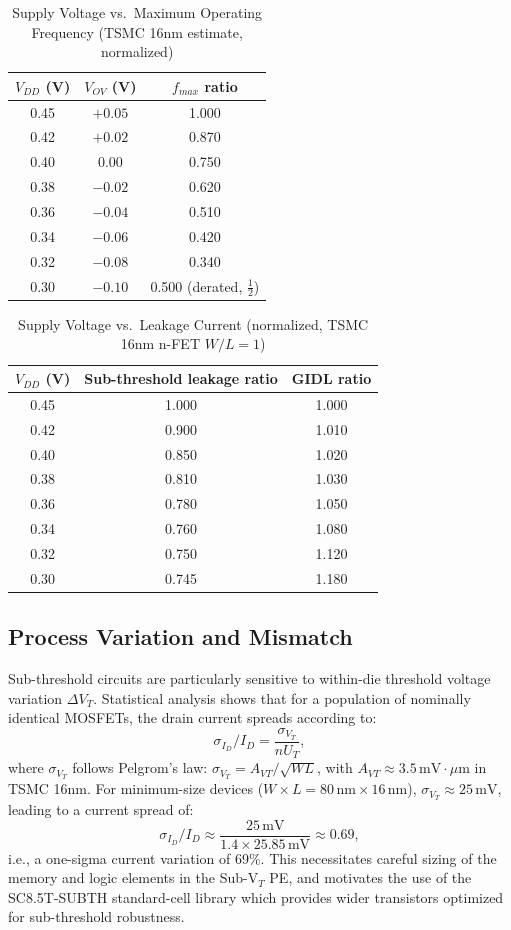 \begin{table}[htbp]
\centering
\caption{Supply Voltage vs.\ Maximum Operating Frequency (TSMC 16nm estimate, normalized)}
\label{tab:v_fmax}
\begin{tabular}{ccc}
\hline
$V_{DD}$ (V) & $V_{OV}$ (V) & $f_{max}$ ratio \\
\hline
0.45 & $+0.05$ & 1.000 \\
0.42 & $+0.02$ & 0.870 \\
0.40 &  $0.00$ & 0.750 \\
0.38 & $-0.02$ & 0.620 \\
0.36 & $-0.04$ & 0.510 \\
0.34 & $-0.06$ & 0.420 \\
0.32 & $-0.08$ & 0.340 \\
0.30 & $-0.10$ & 0.500 (derated, $\frac{1}{2}$) \\
\hline
\end{tabular}
\end{table}

\begin{table}[htbp]
\centering
\caption{Supply Voltage vs.\ Leakage Current (normalized, TSMC 16nm n-FET $W/L=1$)}
\label{tab:v_leakage}
\begin{tabular}{ccc}
\hline
$V_{DD}$ (V) & Sub-threshold leakage ratio & GIDL ratio \\
\hline
0.45 & 1.000 & 1.000 \\
0.42 & 0.900 & 1.010 \\
0.40 & 0.850 & 1.020 \\
0.38 & 0.810 & 1.030 \\
0.36 & 0.780 & 1.050 \\
0.34 & 0.760 & 1.080 \\
0.32 & 0.750 & 1.120 \\
0.30 & 0.745 & 1.180 \\
\hline
\end{tabular}
\end{table}

\subsection{Process Variation and Mismatch}

Sub-threshold circuits are particularly sensitive to within-die threshold voltage variation
$\Delta V_T$.  Statistical analysis shows that for a population of nominally identical
MOSFETs, the drain current spreads according to:
\[
  \sigma_{I_D} / I_D = \frac{\sigma_{V_T}}{n U_T},
\]
where $\sigma_{V_T}$ follows Pelgrom's law: $\sigma_{V_T} = A_{VT} / \sqrt{WL}$, with
$A_{VT} \approx 3.5\,\text{mV}\cdot\mu\text{m}$ in TSMC 16nm.  For minimum-size devices
($W \times L = 80\,\text{nm} \times 16\,\text{nm}$), $\sigma_{V_T} \approx 25\,\text{mV}$,
leading to a current spread of:
\[
  \sigma_{I_D} / I_D \approx \frac{25\,\text{mV}}{1.4 \times 25.85\,\text{mV}} \approx 0.69,
\]
i.e., a one-sigma current variation of 69\%.  This necessitates careful sizing of the
memory and logic elements in the Sub-V$_T$ PE, and motivates the use of the
SC8.5T-SUBTH standard-cell library which provides wider transistors optimized for
sub-threshold robustness.

